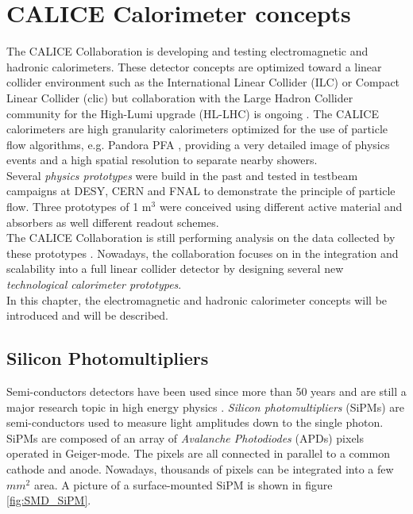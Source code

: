 \chapter{CALICE Calorimeter concepts}
\label{chap:CALICE_Det}

The CALICE Collaboration is developing and testing electromagnetic and hadronic calorimeters. These detector concepts are optimized toward a linear collider environment such as the International Linear Collider (ILC) \cite{ILC_TDR_Vol1} or Compact Linear Collider (\acrshort{clic}) \cite{CLIC_CDR} but collaboration with the Large Hadron Collider community for the High-Lumi upgrade (HL-LHC) is ongoing \cite{1748-0221-12-01-C01042}. The CALICE calorimeters are high granularity calorimeters optimized for the use of particle flow algorithms, e.g. Pandora PFA \cite{Marshall2013}, providing a very detailed image of physics events and a high spatial resolution to separate nearby showers.\\
Several \textit{physics prototypes} were build in the past and tested in testbeam campaigns at DESY, CERN and FNAL \cite{1748-0221-3-08-P08001, 1748-0221-5-05-P05004, 1707.07126v2, 1748-0221-10-10-P10039, 1748-0221-3-05-P05001} to demonstrate the principle of particle flow. Three prototypes of 1 m$^3$ were conceived using different active material and absorbers as well different readout schemes.\\
The CALICE Collaboration is still performing analysis on the data collected by these prototypes \cite{OskarCAN, YasmineCAN}. Nowadays, the collaboration focuses on in the integration and scalability into a full linear collider detector by designing several new \textit{technological calorimeter prototypes}.\\
In this chapter, the electromagnetic and hadronic calorimeter concepts will be introduced and will be described.

\section{Silicon Photomultipliers}

Semi-conductors detectors have been used since more than 50 years and are still a major research topic in high energy physics \cite{1748-0221-4-04-P04004, Garutti:2011qv, Garutti:2017ipx}. \textit{Silicon photomultipliers} (SiPMs) are semi-conductors used to measure light amplitudes down to the single photon. SiPMs are composed of an array of \textit{Avalanche Photodiodes} (APDs) pixels operated in Geiger-mode. The pixels are all connected in parallel to a common cathode and anode. Nowadays, thousands of pixels can be integrated into a few $mm^2$ area. A picture of a surface-mounted SiPM is shown in figure \ref{fig:SMD_SiPM}.


